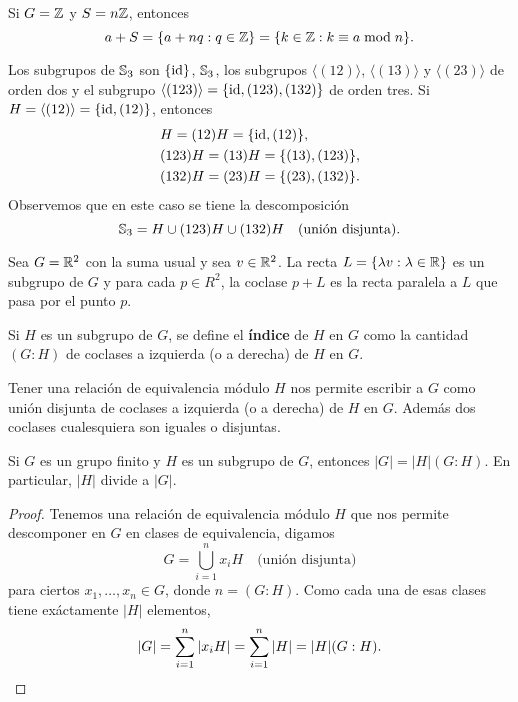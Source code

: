 \begin{example}
Si $G=\mathbb{Z}$ y $S=n\mathbb{Z}$, entonces
\[
a+S=\{a+nq:q\in\mathbb{Z}\}=\{k\in\mathbb{Z}:k\equiv a\bmod n\}.
\]	
\end{example}

\begin{example}
Los subgrupos de $\mathbb{S}_3$ son $\{\operatorname{id}\}$, $\mathbb{S}_3$, los subgrupos $\langle(12)\rangle$, $\langle(13)\rangle$ y $\langle(23)\rangle$ de orden dos 
y el subgrupo $\langle(123)\rangle=\{\operatorname{id},(123),(132)\}$ de orden tres.  	Si $H=\langle(12)\rangle=\{\operatorname{id},(12)\}$, entonces
\begin{align*}
&H=(12)H=\{\operatorname{id},(12)\},\\
&(123)H=(13)H=\{(13),(123)\},\\
&(132)H=(23)H=\{(23),(132)\}.
\end{align*}
Observemos que en este caso se tiene la descomposición
\[
\mathbb{S}_3=H\cup (123)H\cup (132)H\quad\text{(unión disjunta)}.
\]
\end{example}

\begin{example}
Sea $G=\mathbb{R}^2$ con la suma usual y sea $v\in\mathbb{R}^2$. La recta $L=\{\lambda v:\lambda\in\mathbb{R}\}$ es un subgrupo de $G$ y 
para cada $p\in R^2$, la coclase $p+L$ es la recta paralela a $L$ que pasa por el punto $p$.  	
\end{example}


\begin{definition}
	Si $H$ es un subgrupo de $G$, se define el \textbf{índice} de $H$ en $G$
	como la cantidad $(G:H)$ de coclases a izquierda (o a derecha) de $H$ en $G$. 
\end{definition}

Tener una relación de equivalencia módulo $H$ nos permite escribir a $G$ como
unión disjunta de coclases a izquierda (o a derecha) de $H$ en $G$. Además dos
coclases cualesquiera son iguales o disjuntas. 

\begin{theorem}[Lagrange]
	Si $G$ es un grupo finito y $H$ es un subgrupo de $G$, entonces
	$|G|=|H|(G:H)$. En particular, $|H|$ divide a $|G|$. 
\end{theorem}

\begin{proof}
	Tenemos una relación de equivalencia módulo $H$ que nos permite descomponer
	en $G$ en clases de equivalencia, digamos
	\[
	G=\bigcup_{i=1}^n x_iH\quad\text{(unión disjunta)}
	\]
	para ciertos $x_1,\dots,x_n\in G$, donde $n=(G:H)$. Como cada una de esas clases tiene exáctamente
	$|H|$ elementos,  
	\[
		|G|=\sum_{i=1}^n|x_iH|=\sum_{i=1}^n|H|=|H|(G:H).\qedhere
	\]
\end{proof}

